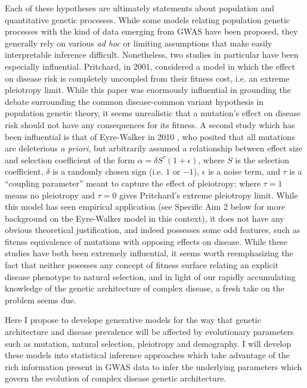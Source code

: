 \documentclass[11pt]{article}
\begin{document}
Each of these hypotheses are ultimately statements about population and quantitative genetic processes. While some models relating population genetic processes with the kind of data emerging from GWAS have been proposed, they generally rely on various \textit{ad hoc} or limiting assumptions that make easily interpretable inference difficult. Nonetheless, two studies in particular have been especially influential. Pritchard, in 2001\cite{Pritchard:2001hw}, considered a model in which the effect on disease risk is completely uncoupled from their fitness cost, i.e. an extreme pleiotropy limit. While this paper was enormously influential in grounding the debate surrounding the common disease-common variant hypothesis in population genetic theory\cite{Pritchard:2002ux}, it seems unrealistic that a mutation's effect on disease risk should not have any consequences for its fitness. A second study which has been influential is that of Eyre-Walker in 2010 \cite{EyreWalker:2010dn}, who posited that all mutations are deleterious \textit{a priori}, but arbitrarily assumed a relationship between effect size and selection coefficient of the form $\alpha =\delta S^\tau (1+\epsilon)$, where $S$ is the selection coefficient, $\delta$ is a randomly chosen sign (i.e. $1$ or $-1$), $\epsilon$ is a noise term, and $\tau$ is a ``coupling parameter'' meant to capture the effect of pleiotropy: where $\tau =1$ means no pleiotropy and $\tau=0$ gives Pritchard's \cite{Pritchard:2001hw} extreme pleiotropy limit. While this model has seen empirical application (see Specific Aim 2 below for more background on the Eyre-Walker model in this context), it does not have any obvious theoretical justification, and indeed possesses some odd features, such as fitenss equivalence of mutations with opposing effects on disease. While these studies have both been extremely influential, it seems worth reemphasizing the fact that neither posesses any concept of fitness surface relating an explicit disease phenotype to natural selection, and in light of our rapidly accumulating knowledge of the genetic architecture of complex disease, a fresh take on the problem seems due. 

Here I propose to develope generative models for the way that genetic architecture and disease prevalence will be affected by evolutionary parameters such as mutation, natural selection, pleiotropy and demography. I will develop these models into statistical inference approaches which take advantage of the rich information present in GWAS data to infer the underlying parameters which govern the evolution of complex disease genetic architecture.
\end{document}
